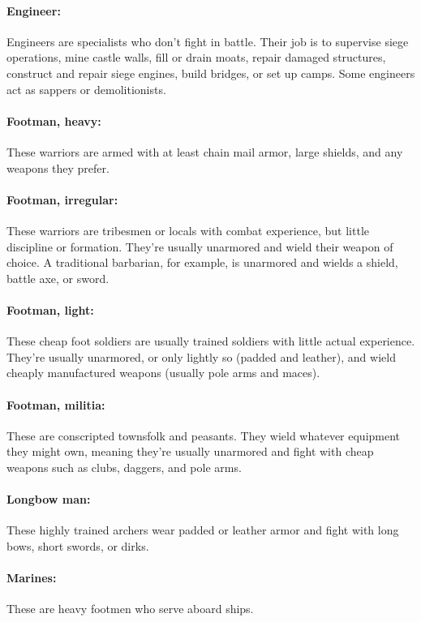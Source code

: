 \begin{multicols}{2}
\paragraph{Engineer:}  Engineers are specialists who don't fight in battle.  Their job is to supervise siege operations, mine castle walls, fill or drain moats, repair damaged structures, construct and repair siege engines, build bridges, or set up camps.  Some engineers act as sappers or demolitionists.

\paragraph{Footman, heavy:}  These warriors are armed with at least chain mail armor, large shields, and any weapons they prefer.

\paragraph{Footman, irregular:}  These warriors are tribesmen or locals with combat experience, but little discipline or formation.  They're usually unarmored and wield their weapon of choice.  A traditional barbarian, for example, is unarmored and wields a shield, battle axe, or sword.

\paragraph{Footman, light:}  These cheap foot soldiers are usually trained soldiers with little actual experience.  They're usually unarmored, or only lightly so (padded and leather), and wield cheaply manufactured weapons (usually pole arms and maces).

\paragraph{Footman, militia:}  These are conscripted townsfolk and peasants.  They wield whatever equipment they might own, meaning they're usually unarmored and fight with cheap weapons such as clubs, daggers, and pole arms.

\paragraph{Longbow man:}  These highly trained archers wear padded or leather armor and fight with long bows, short swords, or dirks.

\paragraph{Marines:} These are heavy footmen who serve aboard ships.


\end{multicols}
